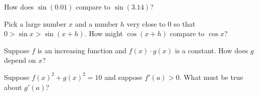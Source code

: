 \documentclass{ximera}
\newcommand{\recommendation}[1]{}
\begin{document}
\begin{shuffle}
\begin{problem}
  How does $\sin(0.01)$ compare to $\sin(3.14)$?
  \begin{multipleChoice}
  \end{multipleChoice}
\end{problem}

\begin{problem}
  Pick a large number $x$ and a number $h$ very close to $0$ so that $0 > \sin x > \sin (x+h)$.  How might $\cos (x+h)$ compare to $\cos x$?
  \begin{multipleChoice}
  \end{multipleChoice}
\end{problem}



\begin{problem}
  Suppose $f$ is an increasing function and $f(x) \cdot g(x)$ is a constant.  How does $g$ depend on $x$?
  \begin{multipleChoice}
  \end{multipleChoice}
\end{problem}

\begin{problem}
  Suppose $f(x)^2 + g(x)^2 = 10$ and suppose $f'(a) > 0$.  What must be true about $g'(a)$?
  \begin{multipleChoice}
  \end{multipleChoice}
\end{problem}




\end{shuffle}
\end{document}
